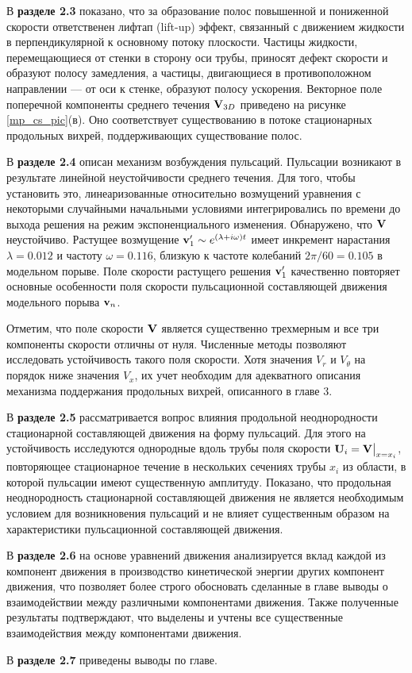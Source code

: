 В \textbf{разделе 2.3} показано, что за образование полос повышенной и пониженной скорости ответственен лифтап (lift-up) эффект, связанный с движением жидкости в перпендикулярной к основному потоку плоскости. Частицы жидкости, перемещающиеся от стенки в сторону оси трубы, приносят дефект скорости и образуют полосу замедления, а частицы, двигающиеся в противоположном направлении --- от оси к стенке, образуют полосу ускорения.
Векторное поле поперечной компоненты среднего течения $\mathbf{V}_{3D}$ приведено на рисунке \ref{mp_cs_pic}(в). Оно соответствует существованию в потоке стационарных продольных вихрей, поддерживающих существование полос. 

В \textbf{разделе 2.4} описан механизм возбуждения пульсаций. Пульсации возникают в результате линейной неустойчивости среднего течения. Для того, чтобы установить это, линеаризованные относительно возмущений уравнения с некоторыми случайными начальными условиями интегрировались по времени до выхода решения на режим экспоненциального изменения. Обнаружено, что $\mathbf{V}$ неустойчиво. Растущее возмущение $\mathbf{v}'_1 \sim e^{(\lambda+i\omega)t}$ имеет инкремент нарастания $\lambda=0.012$ и частоту $\omega=0.116$, близкую к частоте колебаний $2\pi/60=0.105$ в модельном порыве. Поле скорости растущего решения $\mathbf{v}'_1$ качественно повторяет основные особенности поля скорости пульсационной составляющей движения модельного порыва $\mathbf{v}_n$. 

Отметим, что поле скорости $\mathbf{V}$ является существенно трехмерным и все три компоненты скорости отличны от нуля. Численные методы позволяют исследовать устойчивость такого поля скорости. Хотя значения $V_r$ и $V_\theta$ на порядок ниже значения $V_x$, их учет необходим для адекватного описания механизма поддержания продольных вихрей, описанного в главе 3.

В \textbf{разделе 2.5} рассматривается вопрос влияния продольной неоднородности стационарной составляющей движения на форму пульсаций. Для этого на устойчивость исследуются однородные вдоль трубы поля скорости $\mathbf{U}_i = \mathbf{V}\big|_{x=x_i}$, повторяющее стационарное течение в нескольких сечениях трубы $x_i$ из области, в которой пульсации имеют существенную амплитуду. Показано, что продольная неоднородность стационарной составляющей движения не является необходимым условием для возникновения пульсаций и не влияет существенным образом на характеристики пульсационной составляющей движения. 

В \textbf{разделе 2.6} на основе уравнений движения анализируется вклад каждой из компонент движения в производство кинетической энергии других компонент движения, что позволяет более строго обосновать сделанные в главе выводы о взаимодействии между различными компонентами движения. Также полученные результаты подтверждают, что выделены и учтены все существенные взаимодействия между компонентами движения. 

В \textbf{разделе 2.7} приведены выводы по главе. 


%
